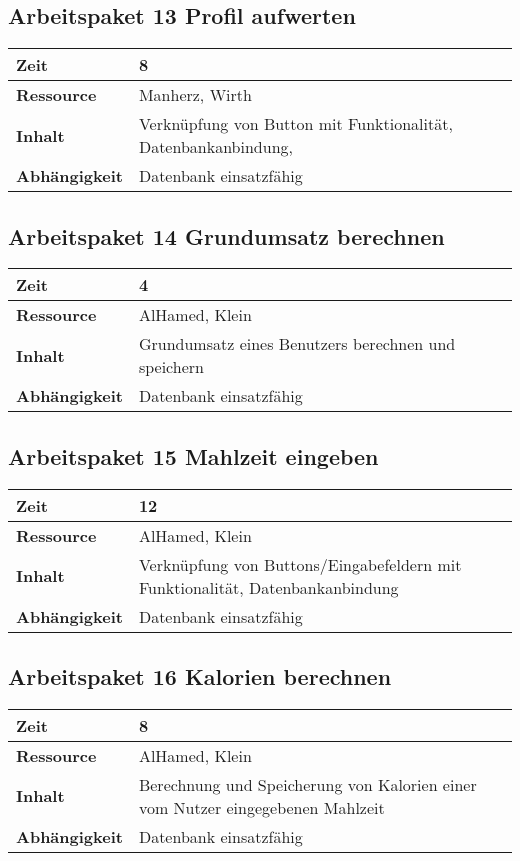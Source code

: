 \documentclass[12pt,a4paper,onecolumn]{article}
\begin{document}
\subsection{Arbeitspaket 13 Profil aufwerten}
\begin{tabularx}{\textwidth}{|l|X|}
\hline
     \textbf{Zeit} & 8 \\
     \hline
     \textbf{Ressource} & Manherz, Wirth\\
     \hline
     \textbf{Inhalt} &  Verknüpfung von Button mit Funktionalität, Datenbankanbindung,\\
     \hline
     \textbf{Abhängigkeit} & Datenbank einsatzfähig\\
\hline
\end{tabularx}
\subsection{Arbeitspaket 14 Grundumsatz berechnen}
\begin{tabularx}{\textwidth}{|l|X|}
\hline
     \textbf{Zeit} & 4 \\
     \hline
     \textbf{Ressource} & AlHamed, Klein \\
     \hline
     \textbf{Inhalt} &  Grundumsatz eines Benutzers berechnen und speichern\\
     \hline
     \textbf{Abhängigkeit} & Datenbank einsatzfähig \\
\hline
\end{tabularx}
\subsection{Arbeitspaket 15 Mahlzeit eingeben}
\begin{tabularx}{\textwidth}{|l|X|}
\hline
     \textbf{Zeit} & 12 \\
     \hline
     \textbf{Ressource} & AlHamed, Klein\\
     \hline
     \textbf{Inhalt} &  Verknüpfung von Buttons/Eingabefeldern mit Funktionalität, Datenbankanbindung\\
     \hline
     \textbf{Abhängigkeit} & Datenbank einsatzfähig\\
\hline
\end{tabularx}
\subsection{Arbeitspaket 16 Kalorien berechnen}
\begin{tabularx}{\textwidth}{|l|X|}
\hline
     \textbf{Zeit} & 8 \\
     \hline
     \textbf{Ressource} & AlHamed, Klein \\
     \hline
     \textbf{Inhalt} &  Berechnung und Speicherung von Kalorien einer vom Nutzer eingegebenen Mahlzeit\\
     \hline
     \textbf{Abhängigkeit} & Datenbank einsatzfähig\\
\hline
\end{tabularx}
\end{document}
